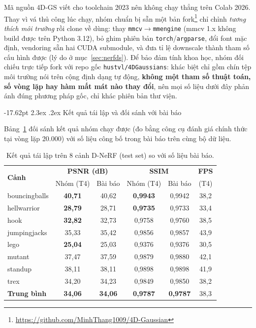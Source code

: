 \documentclass[a4paper]{report}
\makeatletter
\renewcommand\section{\@startsection{section}{1}{\z@}%
    {-17.62pt \@plus -5.89pt \@minus -1.18pt}%
    {2.3ex \@plus .2ex}%
    {\normalfont\fontsize{14.95pt}{16.31pt}\selectfont\bfseries}}
\makeatother
\begin{document}
Mã nguồn 4D-GS viết cho toolchain 2023 nên không chạy thẳng trên Colab 2026. Thay
vì vá thủ công lúc chạy, nhóm chuẩn bị sẵn một bản
fork\footnote{\url{https://github.com/MinhThang1009/4D-Gaussian}} chỉ chỉnh
\textit{tương thích môi trường} rồi clone về dùng: thay
\texttt{mmcv}$\to$\texttt{mmengine} (mmcv 1.x không build được trên Python 3.12),
bỏ ghim phiên bản \texttt{torch}/\texttt{argparse}, đổi font mặc định, vendoring
sẵn hai CUDA submodule, và đưa tỉ lệ downscale thành tham số cấu hình được
(lý do ở mục~\ref{sec:nerfds}). Để bảo đảm tính khoa học, nhóm đối chiếu trực tiếp
fork với repo gốc \texttt{hustvl/4DGaussians}: khác
biệt chỉ gồm chín tệp môi trường nói trên cộng định dạng tự động, \textbf{không
một tham số thuật toán, số vòng lặp hay hàm mất mát nào thay đổi}, nên mọi số
liệu dưới đây phản ánh đúng phương pháp gốc, chỉ khác phiên bản thư viện.

\section{Kết quả tái lập và đối sánh với bài báo}

Bảng~\ref{tab:reproduce} đối sánh kết quả nhóm chạy được (đo bằng
công cụ đánh giá chính thức tại vòng lặp 20.000) với số liệu công bố trong
bài báo trên cùng bộ dữ liệu.

\begin{table}[H]
\centering
\small
\caption[Kết quả tái lập trên D-NeRF]{Kết quả tái lập trên 8 cảnh D-NeRF (test set) so với số liệu bài báo.}
\label{tab:reproduce}
\setlength{\tabcolsep}{5pt}
\begin{tabular}{l|cc|cc|c}
\hline
\multirow{2}{*}{\textbf{Cảnh}} & \multicolumn{2}{c|}{\textbf{PSNR (dB)}}
    & \multicolumn{2}{c|}{\textbf{SSIM}} & \textbf{FPS} \\
 & Nhóm (T4) & Bài báo & Nhóm (T4) & Bài báo & (T4) \\
\hline
bouncingballs & \textbf{40,71} & 40,62 & \textbf{0,9943} & 0,9942 & 38,2 \\
hellwarrior   & \textbf{28,79} & 28,71 & \textbf{0,9735} & 0,9733 & 33,4 \\
hook          & \textbf{32,82} & 32,73 & 0,9758 & 0,9760 & 38,5 \\
jumpingjacks  & 35,33 & 35,42 & 0,9856 & 0,9857 & 43,9 \\
lego          & \textbf{25,04} & 25,03 & 0,9376 & 0,9376 & 30,5 \\
mutant        & 37,47 & 37,59 & 0,9879 & 0,9880 & 42,1 \\
standup       & 38,11 & 38,11 & 0,9898 & 0,9898 & 41,9 \\
trex          & 34,20 & 34,23 & 0,9849 & 0,9850 & 38,2 \\
\hline
\textbf{Trung bình} & \textbf{34,06} & \textbf{34,06} & \textbf{0,9787} & \textbf{0,9787} & 38,3 \\
\hline
\end{tabular}
\end{table}
\end{document}
